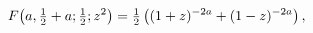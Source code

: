 \[\mathop{F\/}\nolimits\!\left(a,\tfrac{1}{2}+a;\tfrac{1}{2};z^{2}\right)=\tfrac%
{1}{2}\left((1+z)^{-2a}+(1-z)^{-2a}\right),\]